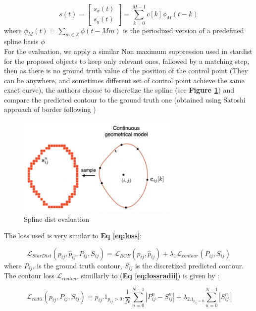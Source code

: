 \documentclass[main.tex]{subfiles}
\begin{document}
\begin{equation}
    s(t) = \left[ \begin{matrix}
        s_x(t)\\
        s_y(t)
    \end{matrix}\right] = \sum_{k=0}^{M-1} c[k]\mathcal{\phi}_M(t-k) 
\end{equation}
where $\phi_M(t) = \sum_{m \in \mathbb{Z}}{\phi(t - Mm)}$ is the periodized version of a predefined spline basis $\phi$\\


For the evaluation, we apply a similar Non maximum suppression used in stardist for the proposed objects to keep only relevant ones, fallowed by a matching step, then as there is no ground truth value of the position of the control point (They can be anywhere, and sometimes different set of control point achieve the same exact curve), the authors choose to discretize the spline  (see \textbf{Figure \ref{fig:gtcontour}}) and compare the predicted contour to the ground truth one (obtained using Satoshi approach of border following \cite{Suzuki1985})
\begin{figure}[H]
    \centering
    \includegraphics[width=8cm]{images/splinedistEval.PNG}
    \caption{Spline dist evaluation}
    \label{fig:gtcontour}
\end{figure}

The loss used is very similar to \textbf{Eq \ref{eq:loss}}:

\begin{equation}
    \mathcal{L}_{\mathit{StarDist}}(p_{ij}, \hat{p}_{ij}, P_{ij}, S_{ij}) = \mathcal{L}_{\mathit{BCE}}(p_{ij}, \hat{p}_{ij}) + \lambda_1\mathcal{L}_{\mathit{contour}}(P_{ij}, S_{ij}) 
\end{equation}
where $P_{ij}$, is the ground truth contour, $S_{ij}$ is the discretized predicted contour.\\

The contour loss $\mathcal{L}_{\mathit{contour}}$ simillarly to (\textbf{Eq \ref{eq:lossradii}}) is given by :

\begin{equation}
        \mathcal{L}_{\mathit{radii}}(p_{ij}, P_{ij}, S_{ij}) = p_{ij}.1_{p_{ij}>0}.\frac{1}{N}\sum_{n=0}^{N-1}|P_{ij}^{n}-S_{ij}^{n}| + \lambda_2.1_{p_{ij}=0}\sum_{n=0}^{N-1}|S_{ij}^{n}|
\end{equation}
\end{document}
